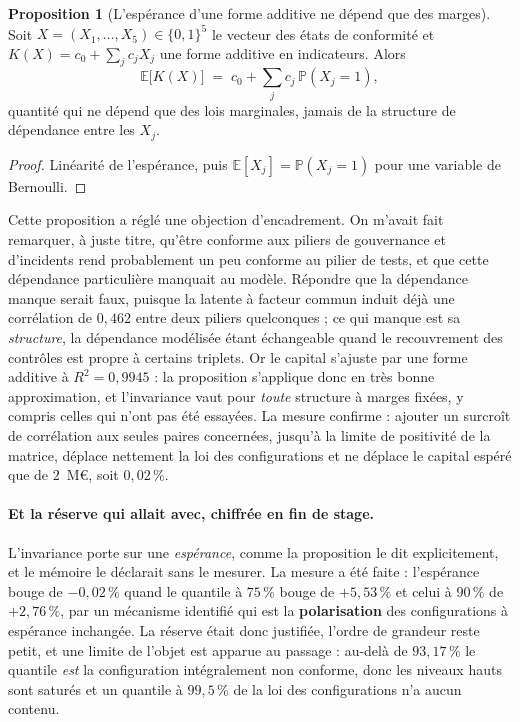 \documentclass[12pt,a4paper]{article}
\theoremstyle{definition}
\newtheorem{proposition}{Proposition}
\begin{document}
\begin{proposition}[L'espérance d'une forme additive ne dépend que des marges]
\label{prop:additif}
Soit $X = (X_1,\dots,X_5) \in \{0,1\}^5$ le vecteur des états de conformité et
$K(X) = c_0 + \sum_j c_j X_j$ une forme additive en indicateurs. Alors
\[
  \mathbb{E}\bigl[K(X)\bigr] \;=\; c_0 + \sum_{j} c_j\,\mathbb{P}(X_j = 1),
\]
quantité qui ne dépend que des lois marginales, jamais de la structure de
dépendance entre les $X_j$.
\end{proposition}

\begin{proof}
Linéarité de l'espérance, puis $\mathbb{E}[X_j] = \mathbb{P}(X_j = 1)$ pour une
variable de Bernoulli.
\end{proof}

Cette proposition a réglé une objection d'encadrement. On m'avait fait remarquer,
à juste titre, qu'être conforme aux piliers de gouvernance et d'incidents rend
probablement un peu conforme au pilier de tests, et que cette dépendance
particulière manquait au modèle. Répondre que la dépendance manque serait faux,
puisque la latente à facteur commun induit déjà une corrélation de $0{,}462$ entre
deux piliers quelconques ; ce qui manque est sa \emph{structure}, la dépendance
modélisée étant échangeable quand le recouvrement des contrôles est propre à
certains triplets. Or le capital s'ajuste par une forme additive à
$R^2 = 0{,}9945$ : la proposition s'applique donc en très bonne approximation, et
l'invariance vaut pour \emph{toute} structure à marges fixées, y compris celles qui
n'ont pas été essayées. La mesure confirme : ajouter un surcroît de corrélation
aux seules paires concernées, jusqu'à la limite de positivité de la matrice,
déplace nettement la loi des configurations et ne déplace le capital espéré que de
$2$~M\euro, soit $0{,}02\,\%$.

\paragraph{Et la réserve qui allait avec, chiffrée en fin de stage.} L'invariance
porte sur une \emph{espérance}, comme la proposition le dit explicitement, et le
mémoire le déclarait sans le mesurer. La mesure a été faite : l'espérance bouge de
$-0{,}02\,\%$ quand le quantile à $75\,\%$ bouge de $+5{,}53\,\%$ et celui à
$90\,\%$ de $+2{,}76\,\%$, par un mécanisme identifié qui est la
\textbf{polarisation} des configurations à espérance inchangée. La réserve était
donc justifiée, l'ordre de grandeur reste petit, et une limite de l'objet est
apparue au passage : au-delà de $93{,}17\,\%$ le quantile \emph{est} la
configuration intégralement non conforme, donc les niveaux hauts sont saturés et un
\og{}quantile à $99{,}5\,\%$ de la loi des configurations\fg{} n'a aucun contenu.
\end{document}
